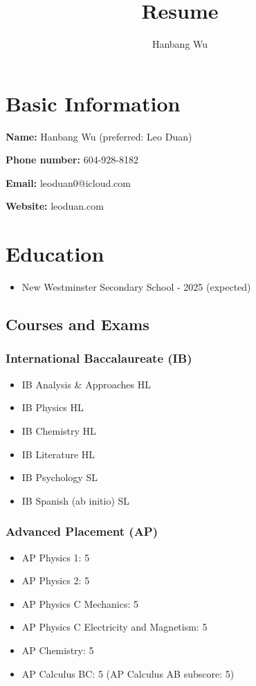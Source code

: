 \documentclass{article}
\title{\textbf{Resume}}
\author{Hanbang Wu}
\date{}
\begin{document}
\maketitle

\section*{Basic Information}

\textbf{Name:} Hanbang Wu (preferred: Leo Duan)

\textbf{Phone number:} 604-928-8182

\textbf{Email:} leoduan0@icloud.com

\textbf{Website:} leoduan.com

\section*{Education}

\begin{itemize}
	\item New Westminster Secondary School - 2025 (expected)
\end{itemize}

\subsection*{Courses and Exams}

\subsubsection*{International Baccalaureate (IB)}

\begin{itemize}
	\item IB Analysis \& Approaches HL
	\item IB Physics HL
	\item IB Chemistry HL
	\item IB Literature HL
	\item IB Psychology SL
	\item IB Spanish (ab initio) SL
\end{itemize}

\subsubsection*{Advanced Placement (AP)}

\begin{itemize}
	\item AP Physics 1: 5
	\item AP Physics 2: 5
	\item AP Physics C Mechanics: 5
	\item AP Physics C Electricity and Magnetism: 5
	\item AP Chemistry: 5
	\item AP Calculus BC: 5 (AP Calculus AB subscore: 5)
\end{itemize}
\end{document}
